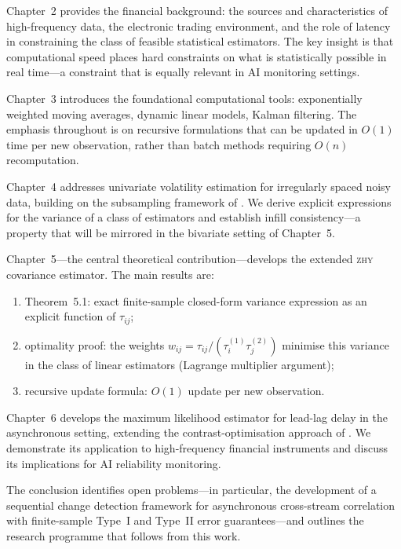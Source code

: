 \documentclass[reqno, 12pt]{amsart}
\newcommand{\tauij}{\tau_{ij}}
\newcommand{\ZHY}{\textsc{zhy}}
\theoremstyle{plain}
\theoremstyle{definition}
\theoremstyle{remark}
\begin{document}
Chapter~2 provides the financial background: the sources and
characteristics of high-frequency data, the electronic trading
environment, and the role of latency in constraining the class of
feasible statistical estimators. The key insight is that computational
speed places hard constraints on what is statistically possible
in real time---a constraint that is equally relevant in AI monitoring
settings.

Chapter~3 introduces the foundational computational tools:
exponentially weighted moving averages, dynamic linear models,
Kalman filtering. The emphasis throughout is on recursive formulations
that can be updated in $O(1)$ time per new observation, rather than
batch methods requiring $O(n)$ recomputation.

Chapter~4 addresses univariate volatility estimation for irregularly
spaced noisy data, building on the subsampling framework of
\citet{zhou1996}. We derive explicit expressions for the variance of
a class of estimators and establish infill consistency---a property
that will be mirrored in the bivariate setting of Chapter~5.

Chapter~5---the central theoretical contribution---develops the
extended \ZHY{} covariance estimator. The main results are:
\begin{enumerate}
  \item Theorem~5.1: exact finite-sample closed-form variance
    expression as an explicit function of $\tauij$;
  \item optimality proof: the weights
    $w_{ij} = \tauij/(\tau_i^{(1)}\tau_j^{(2)})$ minimise this
    variance in the class of linear estimators (Lagrange multiplier
    argument);
  \item recursive update formula: $O(1)$ update per new observation.
\end{enumerate}

Chapter~6 develops the maximum likelihood estimator for lead-lag delay
in the asynchronous setting, extending the contrast-optimisation
approach of \citet{hoffmann2013}. We demonstrate its application to
high-frequency financial instruments and discuss its implications for
AI reliability monitoring.

The conclusion identifies open problems---in particular, the
development of a sequential change detection framework for asynchronous
cross-stream correlation with finite-sample Type~I and Type~II error
guarantees---and outlines the research programme that follows from
this work.

\end{document}
